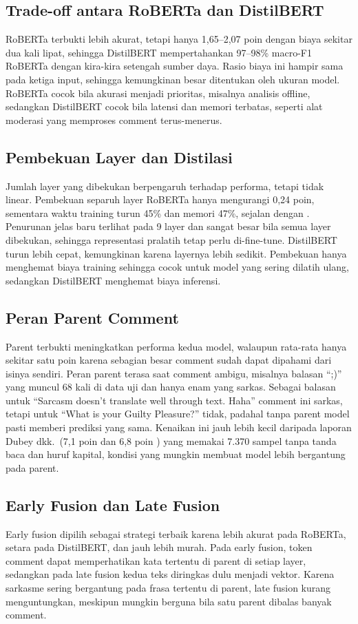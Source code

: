 \documentclass[conference]{IEEEtran}
\begin{document}
\subsection{Trade-off antara RoBERTa dan DistilBERT}
RoBERTa terbukti lebih akurat, tetapi hanya 1,65--2,07 poin dengan biaya sekitar dua kali lipat, sehingga DistilBERT mempertahankan 97--98\% macro-F1 RoBERTa dengan kira-kira setengah sumber daya. Rasio biaya ini hampir sama pada ketiga input, sehingga kemungkinan besar ditentukan oleh ukuran model. RoBERTa cocok bila akurasi menjadi prioritas, misalnya analisis offline, sedangkan DistilBERT cocok bila latensi dan memori terbatas, seperti alat moderasi yang memproses comment terus-menerus.

\subsection{Pembekuan Layer dan Distilasi}
Jumlah layer yang dibekukan berpengaruh terhadap performa, tetapi tidak linear. Pembekuan separuh layer RoBERTa hanya mengurangi 0,24 poin, sementara waktu training turun 45\% dan memori 47\%, sejalan dengan \cite{ardakani2024slimfit}. Penurunan jelas baru terlihat pada 9 layer dan sangat besar bila semua layer dibekukan, sehingga representasi pralatih tetap perlu di-fine-tune. DistilBERT turun lebih cepat, kemungkinan karena layernya lebih sedikit. Pembekuan hanya menghemat biaya training sehingga cocok untuk model yang sering dilatih ulang, sedangkan DistilBERT menghemat biaya inferensi.

\subsection{Peran Parent Comment}
Parent terbukti meningkatkan performa kedua model, walaupun rata-rata hanya sekitar satu poin karena sebagian besar comment sudah dapat dipahami dari isinya sendiri. Peran parent terasa saat comment ambigu, misalnya balasan ``;)'' yang muncul 68 kali di data uji dan hanya enam yang sarkas. Sebagai balasan untuk ``Sarcasm doesn't translate well through text. Haha'' comment ini sarkas, tetapi untuk ``What is your Guilty Pleasure?'' tidak, padahal tanpa parent model pasti memberi prediksi yang sama. Kenaikan ini jauh lebih kecil daripada laporan Dubey dkk.\ (7,1 poin \cite{dubey2026efficient} dan 6,8 poin \cite{dubey2025unpacking}) yang memakai 7.370 sampel tanpa tanda baca dan huruf kapital, kondisi yang mungkin membuat model lebih bergantung pada parent.

\subsection{Early Fusion dan Late Fusion}
Early fusion dipilih sebagai strategi terbaik karena lebih akurat pada RoBERTa, setara pada DistilBERT, dan jauh lebih murah. Pada early fusion, token comment dapat memperhatikan kata tertentu di parent di setiap layer, sedangkan pada late fusion kedua teks diringkas dulu menjadi vektor. Karena sarkasme sering bergantung pada frasa tertentu di parent, late fusion kurang menguntungkan, meskipun mungkin berguna bila satu parent dibalas banyak comment.
\end{document}
